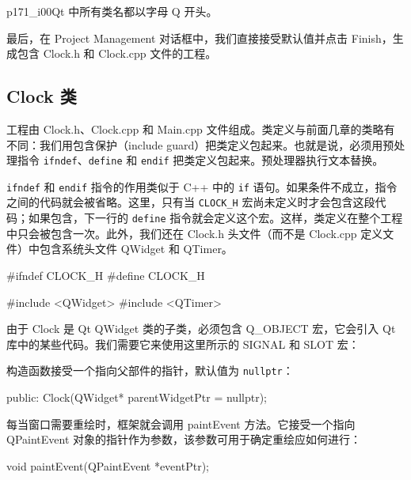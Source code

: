 \begin{myNotic}{p171_i00}{Qt 中所有类名都以字母 Q 开头。}
\end{myNotic}

最后，在 Project Management 对话框中，我们直接接受默认值并点击 Finish，生成包含 Clock.h 和 Clock.cpp 文件的工程。

\subsection{Clock 类}

工程由 Clock.h、Clock.cpp 和 Main.cpp 文件组成。类定义与前面几章的类略有不同：我们用包含保护（include guard）把类定义包起来。也就是说，必须用预处理指令 \texttt{ifndef}、\texttt{define} 和 \texttt{endif} 把类定义包起来。预处理器执行文本替换。

\texttt{ifndef} 和 \texttt{endif} 指令的作用类似于 C++ 中的 \texttt{if} 语句。如果条件不成立，指令之间的代码就会被省略。这里，只有当 \texttt{CLOCK\_H} 宏尚未定义时才会包含这段代码；如果包含，下一行的 \texttt{define} 指令就会定义这个宏。这样，类定义在整个工程中只会被包含一次。此外，我们还在 Clock.h 头文件（而不是 Clock.cpp 定义文件）中包含系统头文件 QWidget 和 QTimer。

\medskip{}

\begin{codebox}
#ifndef CLOCK_H
#define CLOCK_H

#include <QWidget>
#include <QTimer>
\end{codebox}

由于 Clock 是 Qt QWidget 类的子类，必须包含 Q\_OBJECT 宏，它会引入 Qt 库中的某些代码。我们需要它来使用这里所示的 SIGNAL 和 SLOT 宏：

\begin{codebox}
class Clock : public QWidget {
  Q_OBJECT
\end{codebox}

构造函数接受一个指向父部件的指针，默认值为 \texttt{nullptr}：

\begin{codebox}
  public:
    Clock(QWidget* parentWidgetPtr = nullptr);
\end{codebox}

每当窗口需要重绘时，框架就会调用 paintEvent 方法。它接受一个指向 QPaintEvent 对象的指针作为参数，该参数可用于确定重绘应如何进行：

\begin{codebox}
    void paintEvent(QPaintEvent *eventPtr);
\end{codebox}


